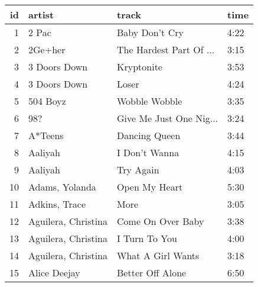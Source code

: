 \begin{tabular}{rlll}
  \toprule
 id & artist & track & time \\ 
  \midrule
    1 & 2 Pac & Baby Don't Cry & 4:22 \\ 
    2 & 2Ge+her & The Hardest Part Of ... & 3:15 \\ 
    3 & 3 Doors Down & Kryptonite & 3:53 \\ 
    4 & 3 Doors Down & Loser & 4:24 \\ 
    5 & 504 Boyz & Wobble Wobble & 3:35 \\ 
    6 & 98? & Give Me Just One Nig... & 3:24 \\ 
    7 & A*Teens & Dancing Queen & 3:44 \\ 
    8 & Aaliyah & I Don't Wanna & 4:15 \\ 
    9 & Aaliyah & Try Again & 4:03 \\ 
   10 & Adams, Yolanda & Open My Heart & 5:30 \\ 
   11 & Adkins, Trace & More & 3:05 \\ 
   12 & Aguilera, Christina & Come On Over Baby & 3:38 \\ 
   13 & Aguilera, Christina & I Turn To You & 4:00 \\ 
   14 & Aguilera, Christina & What A Girl Wants & 3:18 \\ 
   15 & Alice Deejay & Better Off Alone & 6:50 \\ 
   \bottomrule
\end{tabular}
